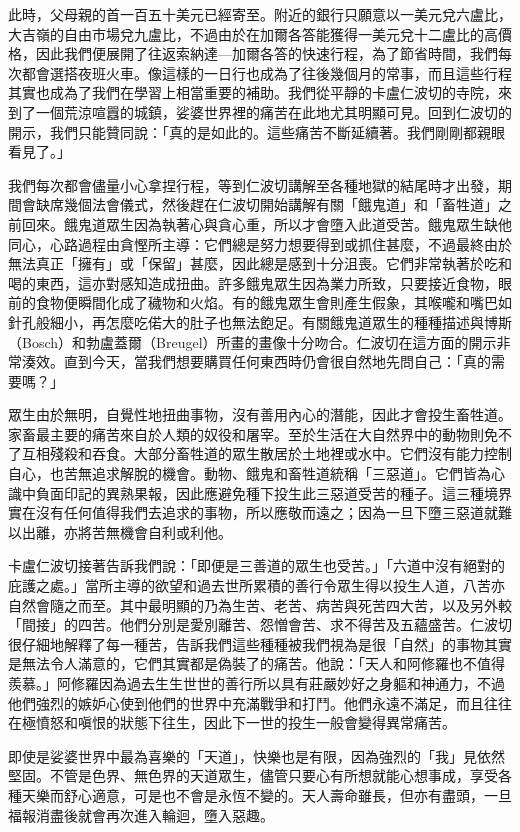 此時，父母親的首一百五十美元已經寄至。附近的銀行只願意以一美元兌六盧比，大吉嶺的自由市場兌九盧比，不過由於在加爾各答能獲得一美元兌十二盧比的高價格，因此我們便展開了往返索納達---加爾各答的快速行程，為了節省時間，我們每次都會選搭夜班火車。像這樣的一日行也成為了往後幾個月的常事，而且這些行程其實也成為了我們在學習上相當重要的補助。我們從平靜的卡盧仁波切的寺院，來到了一個荒涼喧囂的城鎮，娑婆世界裡的痛苦在此地尤其明顯可見。回到仁波切的開示，我們只能贊同說：「真的是如此的。這些痛苦不斷延續著。我們剛剛都親眼看見了。」

我們每次都會儘量小心拿捏行程，等到仁波切講解至各種地獄的結尾時才出發，期間會缺席幾個法會儀式，然後趕在仁波切開始講解有關「餓鬼道」和「畜牲道」之前回來。餓鬼道眾生因為執著心與貪心重，所以才會墮入此道受苦。餓鬼眾生缺他同心，心路過程由貪慳所主導：它們總是努力想要得到或抓住甚麼，不過最終由於無法真正「擁有」或「保留」甚麼，因此總是感到十分沮喪。它們非常執著於吃和喝的東西，這亦對感知造成扭曲。許多餓鬼眾生因為業力所致，只要接近食物，眼前的食物便瞬間化成了穢物和火焰。有的餓鬼眾生會則產生假象，其喉嚨和嘴巴如針孔般細小，再怎麼吃偌大的肚子也無法飽足。有關餓鬼道眾生的種種描述與博斯（Bosch）和勃盧蓋爾（Breugel）所畫的畫像十分吻合。仁波切在這方面的開示非常湊效。直到今天，當我們想要購買任何東西時仍會很自然地先問自己：「真的需要嗎？」

眾生由於無明，自覺性地扭曲事物，沒有善用內心的潛能，因此才會投生畜牲道。家畜最主要的痛苦來自於人類的奴役和屠宰。至於生活在大自然界中的動物則免不了互相殘殺和吞食。大部分畜牲道的眾生散居於土地裡或水中。它們沒有能力控制自心，也苦無追求解脫的機會。動物、餓鬼和畜牲道統稱「三惡道」。它們皆為心識中負面印記的異熟果報，因此應避免種下投生此三惡道受苦的種子。這三種境界實在沒有任何值得我們去追求的事物，所以應敬而遠之；因為一旦下墮三惡道就難以出離，亦將苦無機會自利或利他。

卡盧仁波切接著告訴我們說：「即便是三善道的眾生也受苦。」「六道中沒有絕對的庇護之處。」當所主導的欲望和過去世所累積的善行令眾生得以投生人道，八苦亦自然會隨之而至。其中最明顯的乃為生苦、老苦、病苦與死苦四大苦，以及另外較「間接」的四苦。他們分別是愛別離苦、怨憎會苦、求不得苦及五蘊盛苦。仁波切很仔細地解釋了每一種苦，告訴我們這些種種被我們視為是很「自然」的事物其實是無法令人滿意的，它們其實都是偽裝了的痛苦。他說：「天人和阿修羅也不值得羨慕。」阿修羅因為過去生生世世的善行所以具有莊嚴妙好之身軀和神通力，不過他們強烈的嫉妒心使到他們的世界中充滿戰爭和打鬥。他們永遠不滿足，而且往往在極憤怒和嗔恨的狀態下往生，因此下一世的投生一般會變得異常痛苦。

即使是娑婆世界中最為喜樂的「天道」，快樂也是有限，因為強烈的「我」見依然堅固。不管是色界、無色界的天道眾生，儘管只要心有所想就能心想事成，享受各種天樂而舒心適意，可是也不會是永恆不變的。天人壽命雖長，但亦有盡頭，一旦福報消盡後就會再次進入輪迴，墮入惡趣。

